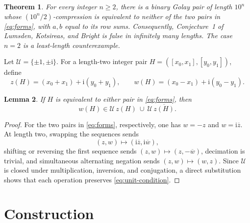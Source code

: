 \documentclass[11pt]{amsart}
\newtheorem{theorem}{Theorem}
\newtheorem{lemma}[theorem]{Lemma}
\newcommand{\ii}{\mathrm{i}}
\begin{document}
\begin{theorem}\label{thm:main}
For every integer $n\ge2$, there is a binary Golay pair of length
$10^n$ whose $(10^n/2)$-compression is equivalent to neither of the
two pairs in \eqref{eq:forms}, with $a,b$ equal to its row sums.
Consequently, Conjecture~1 of Lumsden, Kotsireas, and Bright is
false in infinitely many lengths. The case $n=2$ is a least-length
counterexample.
\end{theorem}

Let $\mathcal U=\{\pm1,\pm\ii\}$. For a length-two integer pair
$H=([x_0,x_1],[y_0,y_1])$, define
\[
z(H)=(x_0+x_1)+\ii(y_0+y_1),
\qquad
w(H)=(x_0-x_1)+\ii(y_0-y_1).
\]

\begin{lemma}\label{lem:obstruction}
If $H$ is equivalent to either pair in \eqref{eq:forms}, then
\begin{equation}\label{eq:unit-condition}
w(H)\in \mathcal U\,z(H)\ \cup\ \mathcal U\,\overline{z(H)}.
\end{equation}
\end{lemma}

\begin{proof}
For the two pairs in \eqref{eq:forms}, respectively, one has
$w=-z$ and $w=\ii\overline z$. At length two, swapping the sequences
sends
\[
(z,w)\longmapsto(\ii\overline z,\ii\overline w),
\]
shifting or reversing the first sequence sends
$(z,w)\mapsto(z,-\overline w)$, decimation is trivial, and simultaneous
alternating negation sends $(z,w)\mapsto(w,z)$. Since $\mathcal U$ is
closed under multiplication, inversion, and conjugation, a direct
substitution shows that each operation preserves
\eqref{eq:unit-condition}.
\end{proof}

\section{Construction}
\end{document}
